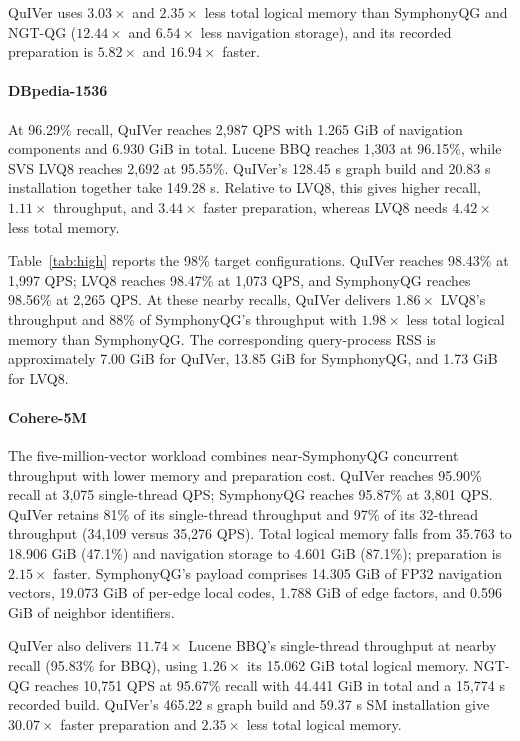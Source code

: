 QuIVer uses $3.03\times$ and $2.35\times$ less total logical memory than SymphonyQG and NGT-QG ($12.44\times$ and $6.54\times$ less navigation storage), and its recorded preparation is $5.82\times$ and $16.94\times$ faster.

\paragraph{DBpedia-1536}
At 96.29\% recall, QuIVer reaches 2,987 QPS with 1.265 GiB of navigation components and 6.930 GiB in total. Lucene BBQ reaches 1,303 at 96.15\%, while SVS LVQ8 reaches 2,692 at 95.55\%. QuIVer's 128.45 s graph build and 20.83 s installation together take 149.28 s. Relative to LVQ8, this gives higher recall, $1.11\times$ throughput, and $3.44\times$ faster preparation, whereas LVQ8 needs $4.42\times$ less total memory.

Table~\ref{tab:high} reports the 98\% target configurations. QuIVer reaches 98.43\% at 1,997 QPS; LVQ8 reaches 98.47\% at 1,073 QPS, and SymphonyQG reaches 98.56\% at 2,265 QPS. At these nearby recalls, QuIVer delivers $1.86\times$ LVQ8's throughput and 88\% of SymphonyQG's throughput with $1.98\times$ less total logical memory than SymphonyQG. The corresponding query-process RSS is approximately 7.00 GiB for QuIVer, 13.85 GiB for SymphonyQG, and 1.73 GiB for LVQ8.

\paragraph{Cohere-5M}
The five-million-vector workload combines near-SymphonyQG concurrent throughput with lower memory and preparation cost. QuIVer reaches 95.90\% recall at 3,075 single-thread QPS; SymphonyQG reaches 95.87\% at 3,801 QPS. QuIVer retains 81\% of its single-thread throughput and 97\% of its 32-thread throughput (34,109 versus 35,276 QPS). Total logical memory falls from 35.763 to 18.906 GiB (47.1\%) and navigation storage to 4.601 GiB (87.1\%); preparation is $2.15\times$ faster. SymphonyQG's payload comprises 14.305 GiB of FP32 navigation vectors, 19.073 GiB of per-edge local codes, 1.788 GiB of edge factors, and 0.596 GiB of neighbor identifiers.

QuIVer also delivers $11.74\times$ Lucene BBQ's single-thread throughput at nearby recall (95.83\% for BBQ), using $1.26\times$ its 15.062 GiB total logical memory. NGT-QG reaches 10,751 QPS at 95.67\% recall with 44.441 GiB in total and a 15,774 s recorded build. QuIVer's 465.22 s graph build and 59.37 s SM installation give $30.07\times$ faster preparation and $2.35\times$ less total logical memory.

